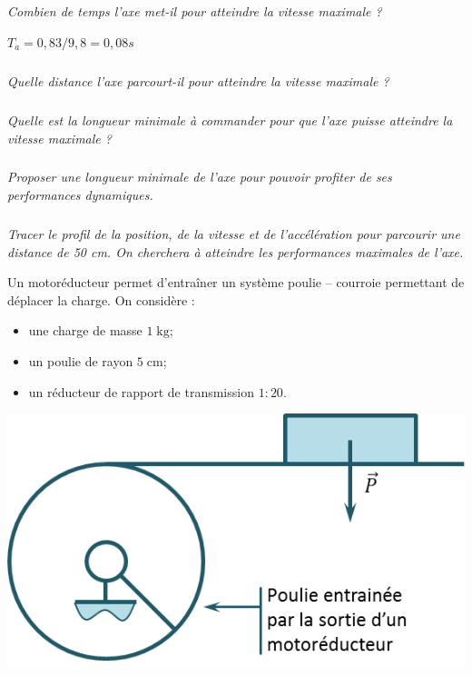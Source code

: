 \documentclass[10pt,fleqn]{book} %
\begin{document}
\begin{multicols}{2}
\subparagraph{}
\textit{Combien de temps l'axe met-il pour atteindre la vitesse maximale ?}
\ifprof
\begin{corrige}
$T_a =0,83/9,8 = 0,08 s$
\end{corrige}
\else
\fi

\subparagraph{}
\textit{Quelle distance l'axe parcourt-il pour atteindre la vitesse maximale ?}
\ifprof
\begin{corrige}
\end{corrige}
\else
\fi


\subparagraph{}
\textit{Quelle est la longueur minimale à commander pour que l'axe puisse atteindre la vitesse maximale ?}
\ifprof
\begin{corrige}
\end{corrige}
\else
\fi

\subparagraph{}
\textit{Proposer une longueur minimale de l'axe pour pouvoir profiter de ses performances dynamiques.}
\ifprof
\begin{corrige}
\end{corrige}
\else
\fi


\subparagraph{}
\textit{Tracer le profil de la position, de la vitesse et de l'accélération pour parcourir une distance de 50 cm. On cherchera à atteindre les performances maximales de l'axe. }
\ifprof
\begin{corrige}
\end{corrige}
\else
\fi


Un motoréducteur permet d'entraîner un système poulie -- courroie permettant de déplacer la charge. On considère :
\begin{itemize}
\item une charge de masse $1\; \text{kg}$;
\item un poulie de rayon $5\; \text{cm}$;
\item un réducteur de rapport de transmission $1:20$.
\end{itemize}

\begin{center}
\includegraphics[width=.9\linewidth]{images/fig_02}
\end{center}


\end{multicols}
\end{document}
